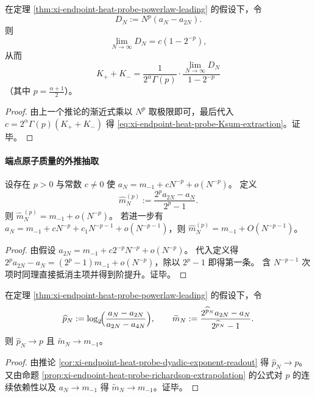\begin{corollary}[端点幂律系数的闭式核验提取]\label{cor:xi-endpoint-heat-probe-powerlaw-coefficient-extraction}
在定理 \ref{thm:xi-endpoint-heat-probe-powerlaw-leading} 的假设下，令
\[
D_N:=N^{p}(a_N-a_{2N}).
\]
则
\[
\lim_{N\to\infty}D_N=c(1-2^{-p}),
\]
从而
\begin{equation}\label{eq:xi-endpoint-heat-probe-Ksum-extraction}
\boxed{\;
K_++K_-=\frac{1}{2^\alpha\Gamma(p)}\cdot
\frac{\lim_{N\to\infty}D_N}{1-2^{-p}}\;}
\end{equation}
（其中 \(p=\tfrac{\alpha+1}{2}\)）。
\end{corollary}
\begin{proof}
由上一个推论的渐近式乘以 \(N^p\) 取极限即可，最后代入 \(c=2^\alpha\Gamma(p)(K_++K_-)\) 得 \eqref{eq:xi-endpoint-heat-probe-Ksum-extraction}。证毕。
\end{proof}

\paragraph{端点原子质量的外推抽取}
\begin{proposition}\label{prop:xi-endpoint-heat-probe-richardson-extrapolation}
设存在 \(p>0\) 与常数 \(c\neq 0\) 使
\(
a_N=m_{-1}+cN^{-p}+o(N^{-p})
\)。
定义
\[
\widehat m_N^{(p)}:=\frac{2^{p}a_{2N}-a_N}{2^{p}-1}.
\]
则 \(\widehat m_N^{(p)}=m_{-1}+o(N^{-p})\)。
若进一步有
\(
a_N=m_{-1}+cN^{-p}+c_1N^{-p-1}+o(N^{-p-1})
\)，则 \(\widehat m_N^{(p)}=m_{-1}+O(N^{-p-1})\)。
\end{proposition}
\begin{proof}
由假设
\(
a_{2N}=m_{-1}+c2^{-p}N^{-p}+o(N^{-p})
\)。
代入定义得
\(
2^pa_{2N}-a_N=(2^p-1)m_{-1}+o(N^{-p})
\)，除以 \(2^p-1\) 即得第一条。
含 \(N^{-p-1}\) 次项时同理直接抵消主项并得到阶提升。证毕。
\end{proof}

\begin{corollary}\label{cor:xi-endpoint-heat-probe-adaptive-extrapolation}
在定理 \ref{thm:xi-endpoint-heat-probe-powerlaw-leading} 的假设下，令
\[
\widehat p_N:=\log_2\!\Bigl(\frac{a_N-a_{2N}}{a_{2N}-a_{4N}}\Bigr),
\qquad
\widetilde m_N:=\frac{2^{\widehat p_N}a_{2N}-a_N}{2^{\widehat p_N}-1}.
\]
则 \(\widehat p_N\to p\) 且 \(\widetilde m_N\to m_{-1}\)。
\end{corollary}
\begin{proof}
由推论 \ref{cor:xi-endpoint-heat-probe-dyadic-exponent-readout} 得 \(\widehat p_N\to p\)。
又由命题 \ref{prop:xi-endpoint-heat-probe-richardson-extrapolation} 的公式对 \(p\) 的连续依赖性以及 \(a_N\to m_{-1}\) 得 \(\widetilde m_N\to m_{-1}\)。证毕。
\end{proof}

